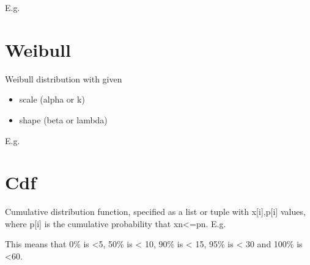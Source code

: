 \documentclass[letterpaper,10pt,english]{sphinxmanual}
\begin{document}
E.g.

\begin{sphinxVerbatim}[commandchars=\\\{\}]
   
\end{sphinxVerbatim}


\section{Weibull}
\label{\detokenize{Distributions:weibull}}
Weibull distribution with given
\begin{itemize}
\item {} 
scale (alpha or k)

\item {} 
shape (beta or lambda)

\end{itemize}

E.g.

\begin{sphinxVerbatim}[commandchars=\\\{\}]
     
\end{sphinxVerbatim}


\section{Cdf}
\label{\detokenize{Distributions:cdf}}
Cumulative distribution function, specified as a list or tuple with x{[}i{]},p{[}i{]} values, where p{[}i{]} is the cumulative probability
that xn\textless{}=pn. E.g.

\begin{sphinxVerbatim}[commandchars=\\\{\}]
           
\end{sphinxVerbatim}

This means that 0\% is \textless{}5, 50\% is \textless{} 10, 90\% is \textless{} 15, 95\% is \textless{} 30 and 100\% is \textless{}60.
\end{document}
